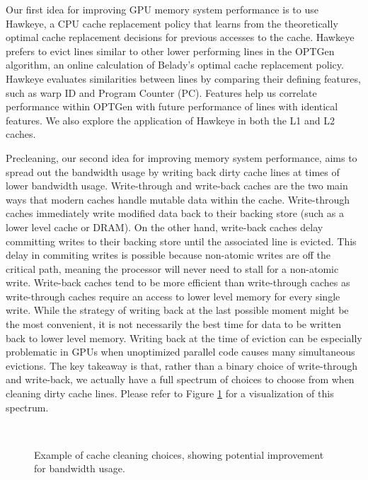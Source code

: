 Our first idea for improving GPU memory system performance is to use Hawkeye, a CPU cache replacement policy that learns from the theoretically optimal cache replacement decisions for previous accesses to the cache. Hawkeye prefers to evict lines similar to other lower performing lines in the OPTGen algorithm, an online calculation of Belady’s optimal cache replacement policy. Hawkeye evaluates similarities between lines by comparing their defining features, such as warp ID and Program Counter (PC). Features help us correlate performance within OPTGen with future performance of lines with identical features. We also explore the application of Hawkeye in both the L1 and L2 caches.

Precleaning, our second idea for improving memory system performance, aims to spread out the bandwidth usage by writing back dirty cache lines at times of lower bandwidth usage. Write-through and write-back caches are the two main ways that modern caches handle mutable data within the cache. Write-through caches immediately write modified data back to their backing store (such as a lower level cache or DRAM). On the other hand, write-back caches delay committing writes to their backing store until the associated line is evicted. This delay in commiting writes is possible because non-atomic writes are off the critical path, meaning the processor will never need to stall for a non-atomic write. Write-back caches tend to be more efficient than write-through caches as write-through caches require an access to lower level memory for every single write. While the strategy of writing back at the last possible moment might be the most convenient, it is not necessarily the best time for data to be written back to lower level memory. Writing back at the time of eviction can be especially problematic in GPUs when unoptimized parallel code causes many simultaneous evictions. The key takeaway is that, rather than a binary choice of write-through and write-back, we actually have a full spectrum of choices to choose from when cleaning dirty cache lines. Please refer to Figure \ref{f:bandwidth_optimal} for a visualization of this spectrum.

\begin{figure}[htb]
\begin{center}
\ 
\caption{Example of cache cleaning choices, showing potential improvement for bandwidth usage.}
\label{f:bandwidth_optimal}
\end{center}
\end{figure}
%

